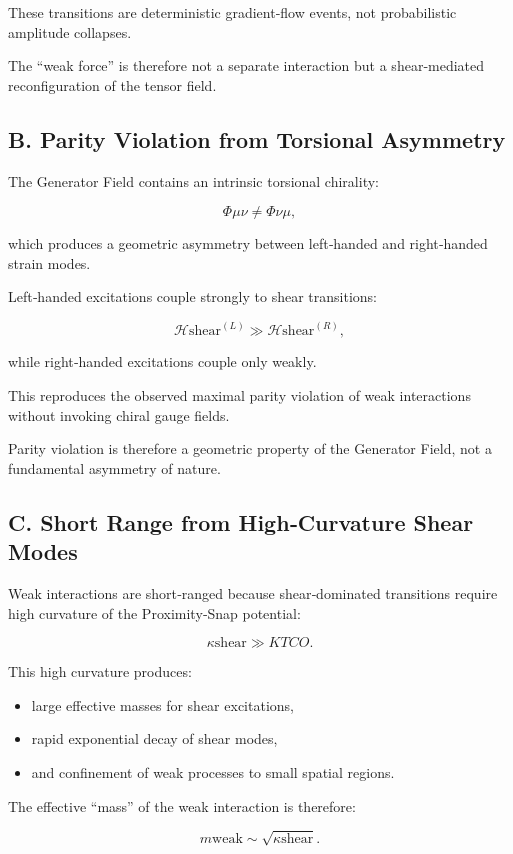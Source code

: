 \documentclass[reprint,amsmath,amssymb,aps,prl,floatfix]{revtex4-2}
\begin{document}
These transitions are deterministic gradient‑flow events, not probabilistic amplitude collapses.
\medskip

The “weak force” is therefore not a separate interaction but a shear‑mediated reconfiguration of the tensor field.

\subsection{B. Parity Violation from Torsional Asymmetry}

The Generator Field contains an intrinsic torsional chirality:

\[
\Phi{\mu\nu} \neq \Phi{\nu\mu},
\]

which produces a geometric asymmetry between left‑handed and right‑handed strain modes.

Left‑handed excitations couple strongly to shear transitions:

\[
\mathcal{H}{\mathrm{shear}}^{(L)} \gg \mathcal{H}{\mathrm{shear}}^{(R)},
\]

while right‑handed excitations couple only weakly.
\medskip

This reproduces the observed maximal parity violation of weak interactions without invoking chiral gauge fields.
\medskip

Parity violation is therefore a geometric property of the Generator Field, not a fundamental asymmetry of nature.

\subsection{C. Short Range from High‑Curvature Shear Modes}

Weak interactions are short‑ranged because shear‑dominated transitions require high curvature of the Proximity‑Snap potential:

\[
\kappa{\mathrm{shear}} \gg K{TCO}.
\]

This high curvature produces:
\begin{itemize}
\item large effective masses for shear excitations,  
\item rapid exponential decay of shear modes,  
\item and confinement of weak processes to small spatial regions.
\end{itemize}

The effective “mass” of the weak interaction is therefore:

\[
m{\mathrm{weak}} \sim \sqrt{\kappa{\mathrm{shear}}}.
\]
\end{document}
